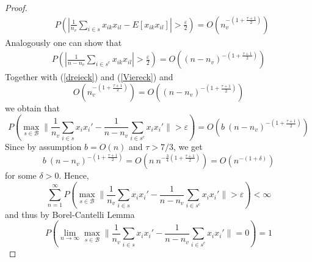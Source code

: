 \documentclass[Research_Module_ES.tex]{subfiles}
\begin{document}
\begin{proof}
\begin{align*}
&P\left(\left| \frac{1}{n_v}\sum_{i\in s}x_{ik}x_{il}-E[x_{ik} x_{il}] \right|>\frac{\varepsilon}{2}\right)=O\left(n_v^{-\left(1+\frac{\tau+1}{2}\right)}\right)
\end{align*}
Analogously one can show that
\begin{align*}
P\left(\left| \frac{1}{n-n_v}\sum_{i\in s^c}x_{ik}x_{il}\right|>\frac{\varepsilon}{2}\right)=O\left((n-n_v)^{-\left(1+\frac{\tau+1}{2}\right)}\right)
\end{align*}
Together with (\ref{dreieck}) and (\ref{Viereck}) and 
\[
	O\left(n_v^{-\left(1+\frac{\tau+1}{2}\right)}\right)=O\left((n-n_v)^{-\left(1+\frac{\tau+1}{2}\right)}\right)
\]
we obtain that
\[
	P\left( \max_{s\in \mathcal{B}}\biggl\lVert \frac{1}{n_v}\sum_{i\in s}x_ix_i' - \frac{1}{n-n_v}\sum_{i\in s^c}x_ix_i'\biggr\rVert>\varepsilon\right)=O\left(b~(n-n_v)^{-\left(1+\frac{\tau+1}{2}\right)}\right)
\]
Since by assumption $b=O(n)$ and $\tau>7/3$, we get 
\[
	b~(n-n_v)^{-\left(1+\frac{\tau+1}{2}\right)}=O\left(n~n^{-\frac{3}{4}\left(1+\frac{\tau+1}{2}\right)}\right)=O\left(n^{-(1+\delta)}\right)
\]
for some $\delta>0$. Hence,
\[
	\sum_{n=1}^{\infty}P\left( \max_{s\in \mathcal{B}}\biggl\lVert \frac{1}{n_v}\sum_{i\in s}x_ix_i' - \frac{1}{n-n_v}\sum_{i\in s^c}x_ix_i'\biggr\rVert>\varepsilon\right)<\infty
\]
and thus by Borel-Cantelli Lemma
\[
	P\left(\lim_{n\to\infty} \max_{s\in \mathcal{B}}\biggl\lVert \frac{1}{n_v}\sum_{i\in s}x_ix_i' - \frac{1}{n-n_v}\sum_{i\in s^c}x_ix_i'\biggr\rVert =0\right)=1
\]
\end{proof}
\end{document}
